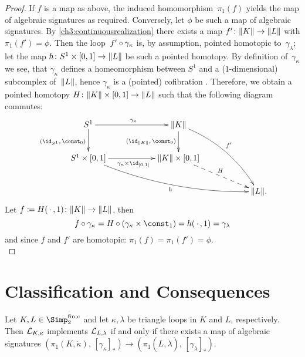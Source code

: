 \begin{proof}
    If $f$ is a map as above, the induced homomorphism~$\pi_1(f)$ yields
    the map of algebraic signatures as required. Conversely, let $\phi$
    be such a map of algebraic signatures. By \cref{ch3:continuousrealization}
    there exists a map $f'\colon\lVert K\rVert\to\lVert L\rVert$ with $\pi_1(f')=\phi$.
    Then the loop~$f'\after\gamma_\kappa$ is, by assumption, pointed homotopic
    to~$\gamma_\lambda$; let the map $h\colon S^1\times[0,1]\to\lVert L\rVert$ be such
    a pointed homotopy. By definition of~$\gamma_\kappa$ we see, that
    $\gamma_\kappa$ defines a homeomorphism between $S^1$ and a
    ($1$-dimensional) subcomplex of~$\lVert L\rVert$, hence $\gamma_\kappa$
    is a (pointed) cofibration .
    Therefore, we obtain a pointed homotopy
    $H\colon\lVert K\rVert\times[0,1]\to\lVert L\rVert$ such that the following diagram
    commutes:
    \[
        \xymatrix@C=2cm{
            S^1
                \ar[r]^{\gamma_\kappa}
                \ar[d]_{(\id_{S^1},\,\const_0)}
            & \geom K
                \ar[d]_{(\id_{\geom K},\,\const_0)}
                \ar@/^1pc/[rdd]^{f'}
            \\
            S^1\times[0,1]
                \ar[r]_{\gamma_\kappa\times\id_{[0,1]}}
                \ar@/_1pc/[rrd]_h
            & \geom{K}\times[0,1]
                \ar@{-->}[rd]^H
            \\
            & & \geom L
            \rlap{.}
        }
    \]
    Let $f \coloneqq H(\,\cdot\,,1)\colon \lVert K\rVert\to \lVert L\rVert$, then
    \[ f\after\gamma_\kappa = H \after (\gamma_\kappa\times\const_1)
        = h(\scdot,1) = \gamma_\lambda
    \]
    and since $f$ and $f'$ are homotopic: $\pi_1(f) = \pi_1(f') = \phi$.
    \\
\end{proof}


\section{Classification and Consequences}
\label{ch2:sec:consequences}
%
\begingroup{}
\begin{thTheorem}
    \label{ch3:classification}
    Let $K,L\in\finSimp$ and let $\kappa,\lambda$ be triangle loops
    in $K$ and $L$, respectively.
    Then $\mathcal{L}_{K,\kappa}$ implements $\mathcal{L}_{L,\lambda}$ if and only if
    there exists a map of algebraic signatures
    $( \pi_1(K,\dot\kappa), \, [\gamma_\kappa]_\ast )
        \to ( \pi_1(L,\dot\lambda), \, [\gamma_\lambda]_\ast )$.
\end{thTheorem}
\endgroup

